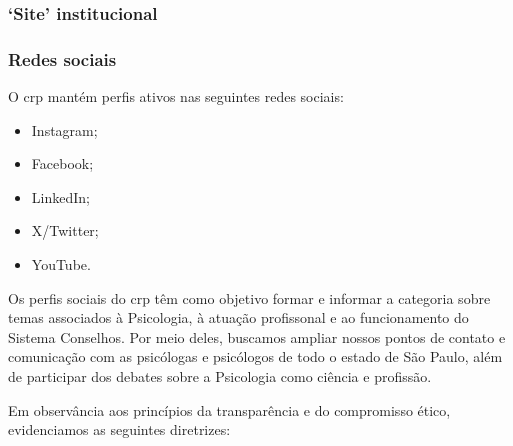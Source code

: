 \subsubsection{`Site' institucional}

\subsubsection{Redes sociais}

O \ac{crp} mantém perfis ativos nas seguintes redes sociais:

\begin{itemize}
	\item
	Instagram;
	\item
	Facebook;
	\item
	LinkedIn;
	\item
	X/Twitter;
	\item
	YouTube.
\end{itemize}

Os perfis sociais do \ac{crp} têm como objetivo formar e informar a categoria sobre temas associados à Psicologia, à atuação profissonal e ao funcionamento do Sistema Conselhos. Por meio deles, buscamos ampliar nossos pontos de contato e comunicação com as psicólogas e psicólogos de todo o estado de São Paulo, além de participar dos debates sobre a
Psicologia como ciência e profissão.

Em observância aos princípios da transparência e do compromisso ético, evidenciamos as seguintes diretrizes:

